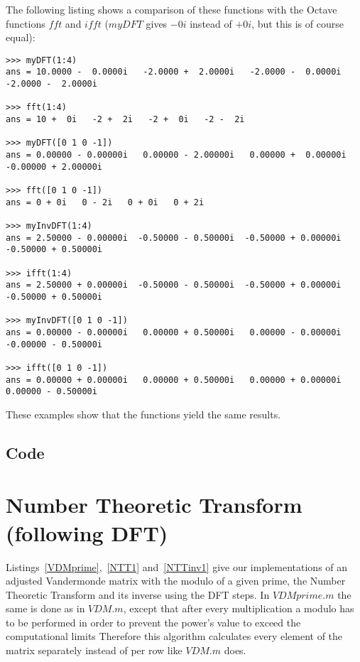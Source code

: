 \documentclass{article}
\begin{document}
The following listing shows a comparison of these functions with the Octave functions $fft$ and $ifft$ ($myDFT$ gives $-0i$ instead of $+0i$, but this is of course equal):

\begin{lstlisting}
>>> myDFT(1:4)
ans = 10.0000 -  0.0000i   -2.0000 +  2.0000i   -2.0000 -  0.0000i   -2.0000 -  2.0000i

>>> fft(1:4)
ans = 10 +  0i   -2 +  2i   -2 +  0i   -2 -  2i

>>> myDFT([0 1 0 -1])
ans = 0.00000 - 0.00000i   0.00000 - 2.00000i   0.00000 +  0.00000i   -0.00000 + 2.00000i

>>> fft([0 1 0 -1])
ans = 0 + 0i   0 - 2i   0 + 0i   0 + 2i

>>> myInvDFT(1:4)
ans = 2.50000 - 0.00000i  -0.50000 - 0.50000i  -0.50000 + 0.00000i   -0.50000 + 0.50000i

>>> ifft(1:4)
ans = 2.50000 + 0.00000i  -0.50000 - 0.50000i  -0.50000 + 0.00000i   -0.50000 + 0.50000i

>>> myInvDFT([0 1 0 -1])
ans = 0.00000 - 0.00000i   0.00000 + 0.50000i   0.00000 - 0.00000i   -0.00000 - 0.50000i

>>> ifft([0 1 0 -1])
ans = 0.00000 + 0.00000i   0.00000 + 0.50000i   0.00000 + 0.00000i    0.00000 - 0.50000i
\end{lstlisting}
These examples show that the functions yield the same results.

\subsection{Code}
 
 
 

\section{Number Theoretic Transform (following DFT)}
Listings~\ref{VDMprime},~\ref{NTT1} and~\ref{NTTinv1} give our implementations of
an adjusted Vandermonde matrix with the modulo of a given prime,
the Number Theoretic Transform and its inverse using the DFT steps.
In $VDMprime.m$ the same is done as in $VDM.m$,
except that after every multiplication a modulo has to be performed
in order to prevent the power's value to exceed the computational limits
Therefore this algorithm calculates every element of the matrix separately instead of per row like $VDM.m$ does.
\end{document}

